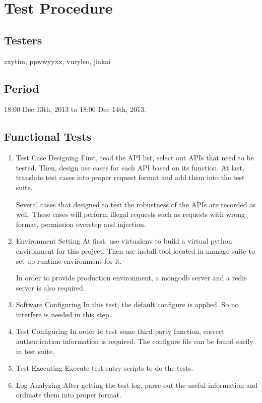 \section{Test Procedure}
\label{sec:test_procedure}
\subsection{Testers}
zxytim, ppwwyyxx, vuryleo, jiakai
\subsection{Period}
18:00 Dec 13th, 2013 to 18:00 Dec 14th, 2013.
\subsection{Functional Tests}
\begin{enumerate}

  \item Test Case Designing
    First, read the API list, select out APIs that need to be tested.
    Then, design use cases for each API based on its function.
    At last, translate test cases into proper request format and add them into the test suite.

    Several cases that designed to test the robustness of the APIs are recorded as well.
    These cases will perform illegal requests such as requests with wrong format, permission overstep and injection.
  \item Environment Setting
    At first, use virtualenv to build a virtual python environment for this project.
    Then use install tool located in manage suite to set up runtime environment for it.

    In order to provide production environment, a mongodb server and a redis server is also required.
  \item Software Configuring
    In this test, the default configure is applied. So no interfere is needed in this step.
  \item Test Configuring
    In order to test some third party function, correct authentication information is required.
    The configure file can be found easily in test suite.
  \item Test Executing
    Execute test entry scripts to do the tests.
  \item Log Analyzing
    After getting the test log, parse out the useful information and ordinate them into proper format.

\end{enumerate}
